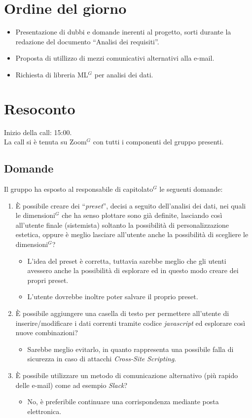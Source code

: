 \section{Ordine del giorno}

\begin{itemize}
	\item Presentazione di dubbi e domande inerenti al progetto, sorti durante la redazione del documento ``Analisi dei requisiti''.
	\item Proposta di utillizzo di mezzi comunicativi alternativi alla e-mail.
	\item Richiesta di libreria ML$^{G}$ per analisi dei dati.
\end{itemize}

\section{Resoconto}

\noindent 
Inizio della call: 15:00. \\
\noindent La call si è tenuta su Zoom$^{G}$ con tutti i componenti del gruppo presenti.
\subsection{Domande}
Il gruppo ha esposto al responsabile di capitolato$^{G}$ le seguenti domande:
\begin{enumerate}
	\item È possibile creare dei ``\textit{preset}'', decisi a seguito dell'analisi dei dati, nei quali le dimensioni$^{G}$ che ha senso plottare sono già definite, lasciando così all'utente finale (sistemista) soltanto la possibilità di personalizzazione estetica, oppure è meglio lasciare all'utente anche la possibilità di scegliere le dimensioni$^{G}$?
	\begin{itemize}
		\item L'idea del preset è corretta, tuttavia sarebbe meglio che gli utenti avessero anche la possibilità di esplorare ed in questo modo creare dei propri preset.
		\item L'utente dovrebbe inoltre poter salvare il proprio preset.
	\end{itemize}
	\item È possibile aggiungere una casella di testo per permettere all'utente di inserire/modificare i dati correnti tramite codice \textit{javascript} ed esplorare così nuove combinazioni?
	\begin{itemize}
		\item Sarebbe meglio evitarlo, in quanto rappresenta una possibile falla di sicurezza in caso di attacchi \textit{Cross-Site Scripting}.
	\end{itemize}
	\item È possibile utilizzare un metodo di comunicazione alternativo (più rapido delle e-mail) come ad esempio \textit{Slack}?
	\begin{itemize}
		\item No, è preferibile continuare una corrispondenza mediante posta elettronica.
	\end{itemize}
	
\end{enumerate}

